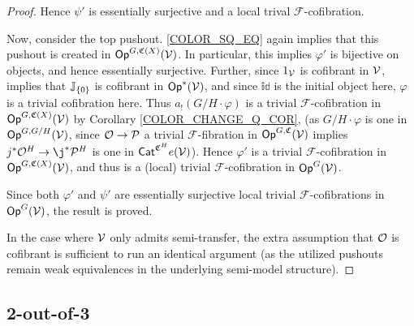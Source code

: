 \documentclass[a4paper,10pt
]{article}%
\renewcommand{\phi}{\varphi}
\renewcommand{\F}{\mathcal F}
\newcommand{\J}{\mathbb J}
\renewcommand{\1}{\ensuremath{\mathbb{id}}}
\begin{document}
\begin{proof}
      Hence $\psi'$ is essentially surjective and a local trival $\F$-cofibration.

      Now, consider the top pushout. \eqref{COLOR_SQ_EQ} again implies that this pushout is created in $\mathsf{Op}^{G, \mathfrak C(X)}(\mathcal V)$.
      In particular, this implies $\phi'$ is bijective on objects, and hence essentially surjective.
      Further, since $1_{\mathcal V}$ is cofibrant in $\mathcal V$, \cite[Thm. 1.15]{BM13} implies that $\J_{\set 0}$ is cofibrant in $\Op^{\**}(\V)$,
      and since $\1$ is the initial object here, $\phi$ is a trivial cofibration here.
      Thus $a_! (G/H \cdot \phi)$ is a trivial $\F$-cofibration in $\mathsf{Op}^{G, \mathfrak C(X)}(\mathcal V)$ by Corollary \ref{COLOR_CHANGE_Q_COR},
      {(as $G/H \cdot \phi$ is one in $\mathsf{Op}^{G, G/H}(\mathcal V)$,
        since $\mathcal{O} \to \mathcal{P}$ a trivial $\F$-fibration in $\mathsf{Op}^{G, \mathfrak C}(\mathcal V)$
        implies $j^{\**}\O^H \to \j^{\**}\P^H$ is one in $\mathsf{Cat}^{\mathfrak C^H}e(\mathcal V)$)}.
      Hence $\phi'$ is a trivial $\F$-cofibration in $\mathsf{Op}^{G,\mathfrak C(X)}(\mathcal V)$,
      and thus is a (local) trivial $\F$-cofibration in $\mathsf{Op}^G(\mathcal V)$.

      Since both $\phi'$ and $\psi'$ are essentially surjective local trivial $\F$-cofibrations in $\mathsf{Op}^G(\mathcal V)$, the result is proved.

      In the case where $\mathcal V$ only admits semi-transfer, the extra assumption that $\mathcal{O}$ is cofibrant is sufficient to run an identical argument
      (as the utilized pushouts remain weak equivalences in the underlying semi-model structure).
\end{proof}


\subsection{2-out-of-3}
\end{document}
